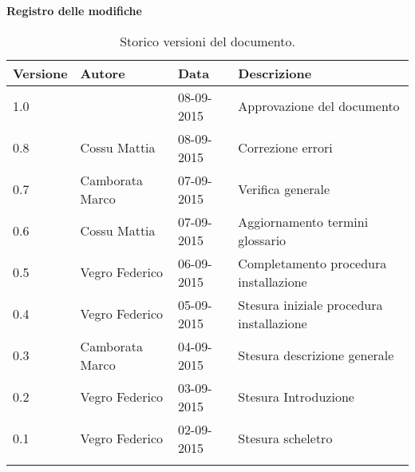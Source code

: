 \begin{Large}
	\textbf{Registro delle modifiche}
\end{Large}

\begin{longtable}{|l|l|l|p{}|}
\hline
\textbf{Versione} & \textbf{Autore} & \textbf{Data} & \textbf{Descrizione} \\
\hline
1.0 &  & 08-09-2015 & Approvazione del documento \\
\hline
0.8 & Cossu Mattia & 08-09-2015 & Correzione errori \\
\hline
0.7 & Camborata Marco & 07-09-2015 & Verifica generale \\
\hline
0.6 & Cossu Mattia & 07-09-2015 & Aggiornamento termini glossario \\
\hline
0.5 & Vegro Federico & 06-09-2015 & Completamento procedura installazione \\
\hline
0.4 & Vegro Federico & 05-09-2015 & Stesura iniziale procedura installazione \\
\hline
0.3 & Camborata Marco & 04-09-2015 & Stesura descrizione generale \\
\hline
0.2 & Vegro Federico & 03-09-2015 & Stesura Introduzione \\
\hline
0.1 & Vegro Federico & 02-09-2015 & Stesura scheletro \\
\hline
\caption{Storico versioni del documento.}
\end{longtable}

